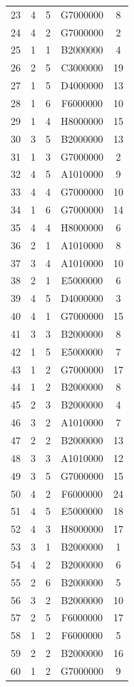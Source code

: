 \documentclass[12pt,a4paper]{article}
\begin{document}
\begin{center}
\begin{longtable}{c c c c c}
23 & 4 & 5 & G7000000 & 8 \\
24 & 4 & 2 & G7000000 & 2 \\
25 & 1 & 1 & B2000000 & 4 \\
26 & 2 & 5 & C3000000 & 19 \\
27 & 1 & 5 & D4000000 & 13 \\
28 & 1 & 6 & F6000000 & 10 \\
29 & 1 & 4 & H8000000 & 15 \\
30 & 3 & 5 & B2000000 & 13 \\
31 & 1 & 3 & G7000000 & 2 \\
32 & 4 & 5 & A1010000 & 9 \\
33 & 4 & 4 & G7000000 & 10 \\
34 & 1 & 6 & G7000000 & 14 \\
35 & 4 & 4 & H8000000 & 6 \\
36 & 2 & 1 & A1010000 & 8 \\
37 & 3 & 4 & A1010000 & 10 \\
38 & 2 & 1 & E5000000 & 6 \\
39 & 4 & 5 & D4000000 & 3 \\
40 & 4 & 1 & G7000000 & 15 \\
41 & 3 & 3 & B2000000 & 8 \\
42 & 1 & 5 & E5000000 & 7 \\
43 & 1 & 2 & G7000000 & 17 \\
44 & 1 & 2 & B2000000 & 8 \\
45 & 2 & 3 & B2000000 & 4 \\
46 & 3 & 2 & A1010000 & 7 \\
47 & 2 & 2 & B2000000 & 13 \\
48 & 3 & 3 & A1010000 & 12 \\
49 & 3 & 5 & G7000000 & 15 \\
50 & 4 & 2 & F6000000 & 24 \\
51 & 4 & 5 & E5000000 & 18 \\
52 & 4 & 3 & H8000000 & 17 \\
53 & 3 & 1 & B2000000 & 1 \\
54 & 4 & 2 & B2000000 & 6 \\
55 & 2 & 6 & B2000000 & 5 \\
56 & 3 & 2 & B2000000 & 10 \\
57 & 2 & 5 & F6000000 & 17 \\
58 & 1 & 2 & F6000000 & 5 \\
59 & 2 & 2 & B2000000 & 16 \\
60 & 1 & 2 & G7000000 & 9 \\

\end{longtable}
\end{center}
\end{document}
